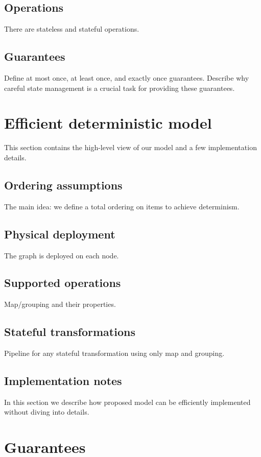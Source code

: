 \documentclass[sigconf]{acmart}
\theoremstyle{remark}
\begin{document}
\subsection{Operations}
There are stateless and stateful operations.

\subsection{Guarantees}
Define at most once, at least once, and exactly once guarantees. Describe why careful state management is a crucial task for providing these guarantees.

\section {Efficient deterministic model}
This section contains the high-level view of our model and a few implementation details.

\subsection{Ordering assumptions}
The main idea: we define a total ordering on items to achieve determinism.

\subsection{Physical deployment}
The graph is deployed on each node.

\subsection{Supported operations}
Map/grouping and their properties.

\subsection{Stateful transformations}
Pipeline for any stateful transformation using only map and grouping. 

\subsection{Implementation notes}
In this section we describe how proposed model can be efficiently implemented without diving into details.

\section{Guarantees}
\end{document}
